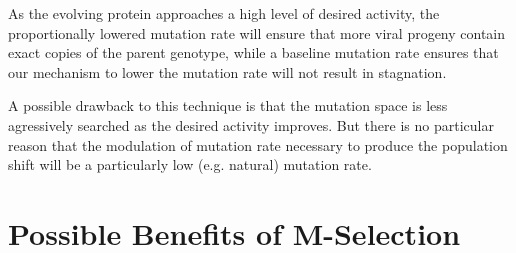 \documentclass[10pt,letterpaper]{article}
\begin{document}
As the evolving protein approaches a high level of desired activity, the proportionally lowered mutation rate will ensure that more viral progeny contain exact copies of the parent genotype, while a baseline mutation rate ensures that our mechanism to lower the mutation rate will not result in stagnation.

A possible drawback to this technique is that the mutation space is less agressively searched as the desired activity improves.  But there is no particular reason that the modulation of mutation rate necessary to produce the population shift will be a particularly low (e.g. natural) mutation rate.

\section{Possible Benefits of M-Selection}
\end{document}
